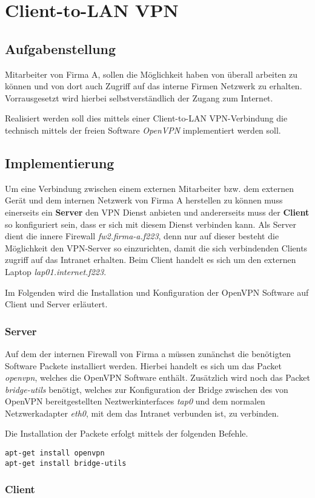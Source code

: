 \chapter{Client-to-LAN VPN}

\section{Aufgabenstellung}

Mitarbeiter von Firma A, sollen die Möglichkeit haben von überall arbeiten zu können und von dort auch Zugriff auf das interne Firmen Netzwerk zu erhalten.
Vorrausgesetzt wird hierbei selbstverständlich der Zugang zum Internet.

Realisiert werden soll dies mittels einer Client-to-LAN VPN-Verbindung die technisch mittels der freien Software \emph{OpenVPN} implementiert werden soll.

\section{Implementierung}

Um eine Verbindung zwischen einem externen Mitarbeiter bzw. dem externen Gerät und dem internen Netzwerk von Firma A herstellen zu können muss einerseits ein \textbf{Server} den VPN Dienst anbieten und andererseits muss der \textbf{Client} so konfiguriert sein, dass er sich mit diesem Dienst verbinden kann.
Als Server dient die innere Firewall \emph{fw2.firma-a.f223}, denn nur auf dieser besteht die Möglichkeit den VPN-Server so einzurichten, damit die sich verbindenden Clients zugriff auf das Intranet erhalten.
Beim Client handelt es sich um den externen Laptop \emph{lap01.internet.f223}.

Im Folgenden wird die Installation und Konfiguration der OpenVPN Software auf Client und Server erläutert.


\subsection{Server}

Auf dem der internen Firewall von Firma a müssen zunänchst die benötigten Software Packete installiert werden. Hierbei handelt es sich um das Packet \emph{openvpn}, welches die OpenVPN Software enthält. Zusätzlich wird noch das Packet \emph{bridge-utils} benötigt, welches zur Konfiguration der Bridge zwischen des von OpenVPN bereitgestellten Neztwerkinterfaces \emph{tap0} und dem normalen Netzwerkadapter \emph{eth0}, mit dem das Intranet verbunden ist, zu verbinden.

Die Installation der Packete erfolgt mittels der folgenden Befehle.

\begin{lstlisting}
apt-get install openvpn
apt-get install bridge-utils
\end{lstlisting}


\subsection{Client}
